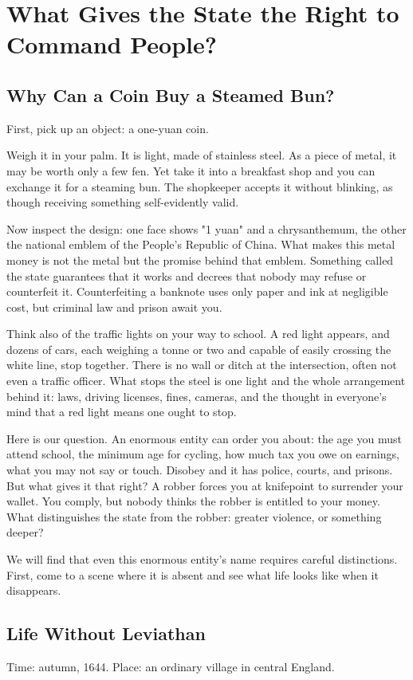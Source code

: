 \chapter[Why May the State Command Us?]{What Gives the State the Right to Command People?}
\section{Why Can a Coin Buy a Steamed Bun?}
First, pick up an object: a one-yuan coin.

Weigh it in your palm. It is light, made of stainless steel. As a piece of metal, it may be worth only a few fen. Yet take it into a breakfast shop and you can exchange it for a steaming bun. The shopkeeper accepts it without blinking, as though receiving something self-evidently valid.

Now inspect the design: one face shows "1 yuan" and a chrysanthemum, the other the national emblem of the People's Republic of China. What makes this metal money is not the metal but the promise behind that emblem. Something called the state guarantees that it works and decrees that nobody may refuse or counterfeit it. Counterfeiting a banknote uses only paper and ink at negligible cost, but criminal law and prison await you.

Think also of the traffic lights on your way to school. A red light appears, and dozens of cars, each weighing a tonne or two and capable of easily crossing the white line, stop together. There is no wall or ditch at the intersection, often not even a traffic officer. What stops the steel is one light and the whole arrangement behind it: laws, driving licenses, fines, cameras, and the thought in everyone's mind that a red light means one ought to stop.

Here is our question. An enormous entity can order you about: the age you must attend school, the minimum age for cycling, how much tax you owe on earnings, what you may not say or touch. Disobey and it has police, courts, and prisons. But what gives it that right? A robber forces you at knifepoint to surrender your wallet. You comply, but nobody thinks the robber is entitled to your money. What distinguishes the state from the robber: greater violence, or something deeper?

We will find that even this enormous entity's name requires careful distinctions. First, come to a scene where it is absent and see what life looks like when it disappears.

\section{Life Without Leviathan}
Time: autumn, 1644. Place: an ordinary village in central England.

